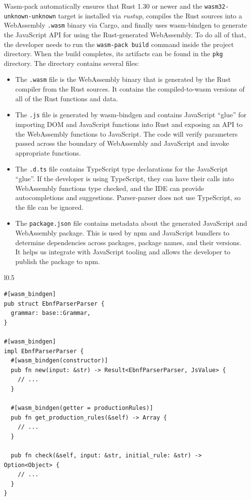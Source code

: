 \documentclass[english,bachelors,forcepolishlogotype]{wizthesis}
\newcommand{\thisproject}{Parser-parser}
\begin{document}
Wasm-pack automatically ensures that Rust 1.30 or newer and the
\texttt{wasm32-unknown-unknown} target is installed via \emph{rustup}, compiles
the Rust sources into a WebAssembly \texttt{.wasm} binary via Cargo, and finally
uses wasm-bindgen to generate the JavaScript API for using the Rust-generated
WebAssembly. To do all of that, the developer needs to run the \texttt{wasm-pack
build} command inside the project directory. When the build completes, its
artifacts can be found in the \texttt{pkg} directory. The directory contains
several files:
\begin{itemize}
  \item The \texttt{.wasm} file is the WebAssembly binary that is generated by
  the Rust compiler from the Rust sources. It contains the compiled-to-wasm
  versions of all of the Rust functions and data.
  \item The \texttt{.js} file is generated by wasm-bindgen and contains
  JavaScript ``glue'' for importing DOM and JavaScript functions into Rust and
  exposing an API to the WebAssembly functions to JavaScript. The code will
  verify parameters passed across the boundary of WebAssembly and JavaScript and
  invoke appropriate functions.
  \item The \texttt{.d.ts} file contains TypeScript type declarations for the
  JavaScript ``glue''. If the developer is using TypeScript, they can have their
  calls into WebAssembly functions type checked, and the IDE can provide
  autocompletions and suggestions. \thisproject{} does not use TypeScript, so
  the file can be ignored.
  \item The \texttt{package.json} file contains metadata about the generated
  JavaScript and WebAssembly package. This is used by npm and JavaScript
  bundlers to determine dependencies across packages, package names, and their
  versions. It helps us integrate with JavaScript tooling and allows the
  developer to publish the package to npm.
\end{itemize}

\begin{wraplisting}{l}{0.5\textwidth}
  \begin{verbatim}
#[wasm_bindgen]
pub struct EbnfParserParser {
  grammar: base::Grammar,
}

#[wasm_bindgen]
impl EbnfParserParser {
  #[wasm_bindgen(constructor)]
  pub fn new(input: &str) -> Result<EbnfParserParser, JsValue> {
    // ...
  }

  #[wasm_bindgen(getter = productionRules)]
  pub fn get_production_rules(&self) -> Array {
    // ...
  }

  pub fn check(&self, input: &str, initial_rule: &str) -> Option<Object> {
    // ...
  }
}
  \end{verbatim}
  \caption{The definition of the EBNF parser struct that encapsulates the
  grammar.}
  \label{lst:wasm-glue-parser}
\end{wraplisting}
\end{document}

